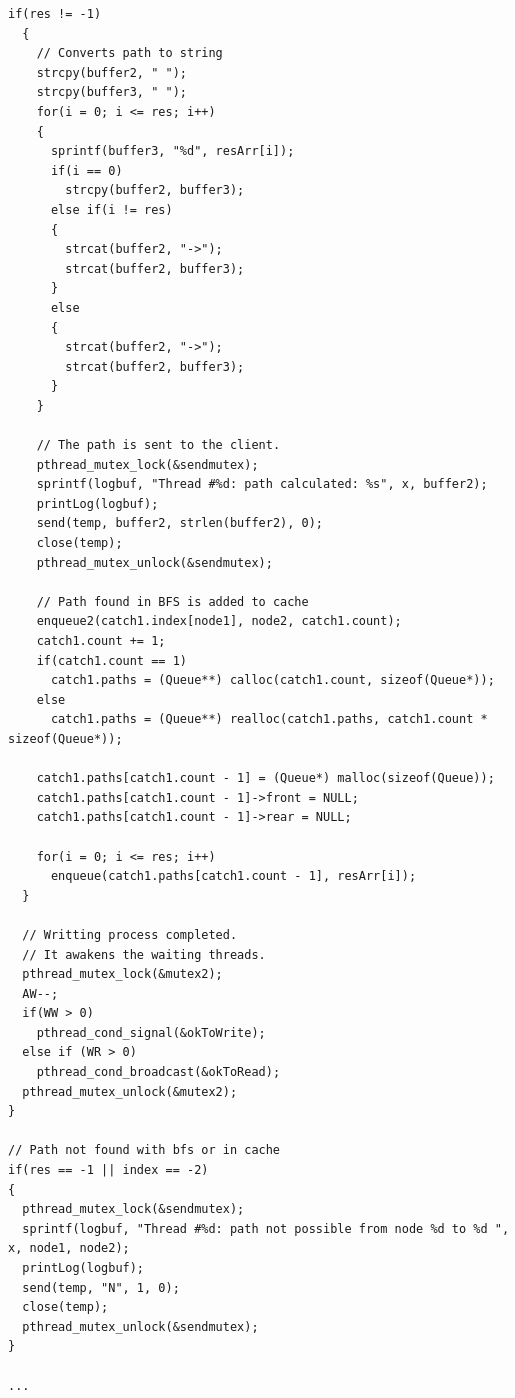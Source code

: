 \documentclass{article}
\begin{document}
\begin{lstlisting}[style=CStyle]
  if(res != -1)
  {
    // Converts path to string
    strcpy(buffer2, " ");
    strcpy(buffer3, " ");
    for(i = 0; i <= res; i++)
    {
      sprintf(buffer3, "%d", resArr[i]);
      if(i == 0)
        strcpy(buffer2, buffer3);
      else if(i != res)
      {
        strcat(buffer2, "->");
        strcat(buffer2, buffer3);
      }
      else
      {
        strcat(buffer2, "->");
        strcat(buffer2, buffer3);
      }
    }

    // The path is sent to the client.
    pthread_mutex_lock(&sendmutex);
    sprintf(logbuf, "Thread #%d: path calculated: %s", x, buffer2);
    printLog(logbuf);
    send(temp, buffer2, strlen(buffer2), 0);
    close(temp);
    pthread_mutex_unlock(&sendmutex);

    // Path found in BFS is added to cache
    enqueue2(catch1.index[node1], node2, catch1.count);
    catch1.count += 1;
    if(catch1.count == 1)
      catch1.paths = (Queue**) calloc(catch1.count, sizeof(Queue*));
    else
      catch1.paths = (Queue**) realloc(catch1.paths, catch1.count * sizeof(Queue*));

    catch1.paths[catch1.count - 1] = (Queue*) malloc(sizeof(Queue));
    catch1.paths[catch1.count - 1]->front = NULL;
    catch1.paths[catch1.count - 1]->rear = NULL;

    for(i = 0; i <= res; i++)
      enqueue(catch1.paths[catch1.count - 1], resArr[i]);
  }

  // Writting process completed.
  // It awakens the waiting threads.
  pthread_mutex_lock(&mutex2);
  AW--;
  if(WW > 0)
    pthread_cond_signal(&okToWrite);
  else if (WR > 0)
    pthread_cond_broadcast(&okToRead);
  pthread_mutex_unlock(&mutex2);
}

// Path not found with bfs or in cache
if(res == -1 || index == -2)
{
  pthread_mutex_lock(&sendmutex);
  sprintf(logbuf, "Thread #%d: path not possible from node %d to %d ", x, node1, node2);
  printLog(logbuf);
  send(temp, "N", 1, 0);
  close(temp);
  pthread_mutex_unlock(&sendmutex);
}
  
...
\end{lstlisting}
\end{document}

